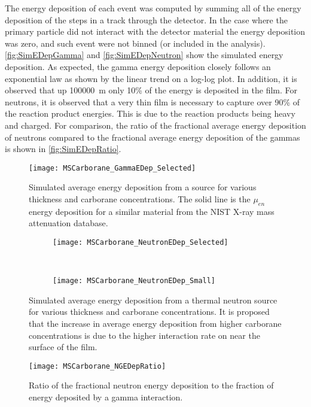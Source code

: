 \documentclass[draftcls,onecolumn]{IEEEtran}
\begin{document}
The energy deposition of each event was computed by summing all of the energy deposition of the steps in a track through the detector.
In the case where the primary particle did not interact with the detector material the energy deposition was zero, and such event were not binned (or included in the analysis).
\autoref{fig:SimEDepGamma} and  \autoref{fig:SimEDepNeutron} show the simulated energy deposition.
As expected, the gamma energy deposition closely follows an exponential law as shown by the linear trend on a log-log plot.
In addition, it is observed that up \SI{100000}{\m}  only 10\% of the  energy is deposited in the film.
For neutrons, it is observed that a very thin film is necessary to capture over 90\% of the reaction product energies.
This is due to the reaction products being heavy and charged.
For comparison, the ratio of the fractional average energy deposition of neutrons compared to the fractional average energy deposition of the gammas is shown in \autoref{fig:SimEDepRatio}.
\begin{figure}
  \centering
  \texttt{[image: MSCarborane\_GammaEDep\_Selected]}
  \caption[Simulated Average Gamma Energy Deposition]{Simulated average energy deposition from a  source for various thickness and carborane concentrations.  The solid line is the $\mu_{en}$ energy deposition for a similar material from the NIST X-ray mass attenuation database.}
  \label{fig:SimEDepGamma}
\end{figure}
\begin{figure}
  \centering
  \begin{subfigure}[b]{0.45\textwidth}
  \texttt{[image: MSCarborane\_NeutronEDep\_Selected]}
  \end{subfigure}%
  ~
  \begin{subfigure}[b]{0.45\textwidth}
  \texttt{[image: MSCarborane\_NeutronEDep\_Small]}
  \end{subfigure}%
  \caption[Simulated Average Neutron Energy Deposition]{Simulated average energy deposition from a thermal neutron source for various thickness and carborane concentrations.  It is proposed that the increase in average energy deposition from higher carborane concentrations is due to the higher interaction rate on near the surface of the film.}
  \label{fig:SimEDepNeutron}
\end{figure}
\begin{figure}
  \centering
  \texttt{[image: MSCarborane\_NGEDepRatio]}
  \caption[Ratio of Fractional Neutron Energy Deposition to Gamma]{Ratio of the fractional neutron energy deposition to the fraction of energy deposited by a gamma interaction.}
  \label{fig:SimEDepRatio}
\end{figure}
\end{document}
